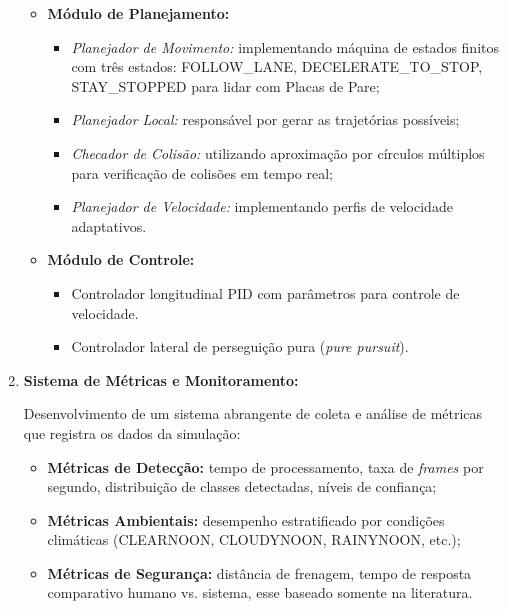 \documentclass[
	12pt,				%
	oneside, %
	a4paper,			%
	english,			%
	french,				%
	spanish,			%
	brazil				%
	]{abntex2}
\begin{document}
\begin{enumerate}
\begin{itemize}
    \item \textbf{Módulo de Planejamento:}
        \begin{itemize}
        \item \textit{Planejador de Movimento:} implementando máquina de estados finitos com três estados: FOLLOW\_LANE, DECELERATE\_TO\_STOP, STAY\_STOPPED para lidar com Placas de Pare;
        \item \textit{Planejador Local:} responsável por gerar as trajetórias possíveis;
        \item \textit{Checador de Colisão:} utilizando aproximação por círculos múltiplos para verificação de colisões em tempo real;
        \item \textit{Planejador de Velocidade:} implementando perfis de velocidade adaptativos.
        \end{itemize}
        
    \item \textbf{Módulo de Controle:}
        \begin{itemize}
        \item Controlador longitudinal PID com parâmetros para controle de velocidade.
        \item Controlador lateral de perseguição pura (\textit{pure pursuit}).
        \end{itemize}
    \end{itemize}
    
    \item \textbf{Sistema de Métricas e Monitoramento:}
    
    Desenvolvimento de um sistema abrangente de coleta e análise de métricas que registra os dados da simulação:
    
    \begin{itemize}
    \item \textbf{Métricas de Detecção:} tempo de processamento, taxa de \textit{frames} por segundo, distribuição de classes detectadas, níveis de confiança;
    \item \textbf{Métricas Ambientais:} desempenho estratificado por condições climáticas (CLEARNOON, CLOUDYNOON, RAINYNOON, etc.);
    \item \textbf{Métricas de Segurança:} distância de frenagem, tempo de resposta comparativo humano vs. sistema, esse baseado somente na literatura.
    \end{itemize}
    

\end{enumerate}
\end{document}
